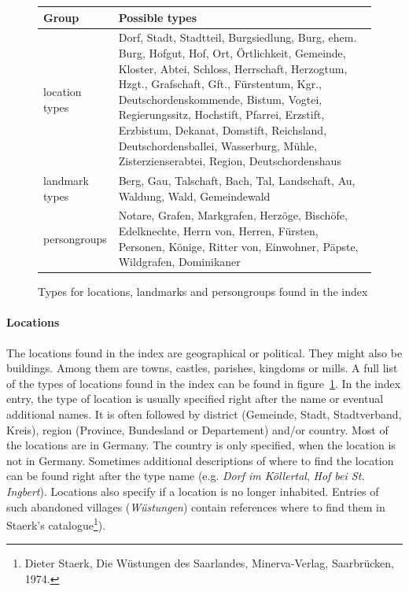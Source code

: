 \begin{figure}[h]
\centering
\begin{tabular}{|l|p{10cm}|}
\hline
\textbf{Group}        & \textbf{Possible types}  \\
\hline
location types & Dorf, Stadt, Stadtteil, Burgsiedlung, Burg,  ehem. Burg, Hofgut, Hof, Ort, Örtlichkeit, Gemeinde, Kloster,   Abtei, Schloss, Herrschaft, Herzogtum, Hzgt., Grafschaft,    Gft., Fürstentum, Kgr., Deutschordenskommende, Bistum,     Vogtei, Regierungssitz, Hochstift, Pfarrei, Erzstift, Erzbistum, Dekanat, Domstift, Reichsland, Deutschordensballei, Wasserburg, Mühle, Zisterzienserabtei, Region, Deutschordenshaus \\
\hline
landmark types & Berg, Gau, Talschaft, Bach, Tal, Landschaft, Au, Waldung, Wald, Gemeindewald \\
\hline
persongroups   & Notare, Grafen, Markgrafen, Herzöge, Bischöfe, Edelknechte, Herrn von, Herren, Fürsten, Personen, Könige, Ritter von, Einwohner, Päpste, Wildgrafen, Dominikaner \\
\hline
\end{tabular} 
\caption{Types for locations, landmarks and persongroups found in the index}
\label{fig:location-list}
\end{figure}

\paragraph{Locations}
The locations found in the index are geographical or political. They might also be buildings. Among them are towns, castles, parishes, kingdoms or mills. A full list of the types of locations found in the index can be found in figure~\ref{fig:location-list}. In the index entry, the type of location is usually specified right after the name or eventual additional names. It is often followed by district (Gemeinde, Stadt, Stadtverband, Kreis), region (Province, Bundesland or Departement) and/or country. Most of the locations are in Germany. The country is only specified, when the location is not in Germany. Sometimes additional descriptions of where to find the location can be found right after the type name (e.g. \textit{Dorf im Köllertal}, \textit{Hof bei St. Ingbert}). Locations also specify if a location is no longer inhabited. Entries of such abandoned villages (\textit{Wüstungen}) contain references where to find them in Staerk's catalogue\footnote{Dieter Staerk, Die Wüstungen des Saarlandes, Minerva-Verlag, Saarbrücken, 1974.}). %

